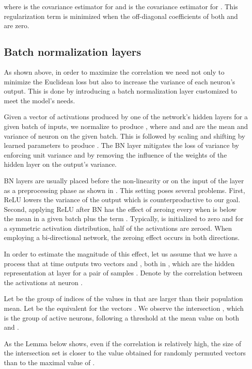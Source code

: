 \documentclass[10pt,twocolumn,letterpaper]{article}
\begin{document}
where  is the covariance estimator for  and  is the covariance estimator for . This regularization term is minimized when the off-diagonal coefficients of both  and  are zero.

\subsection{Batch normalization layers}\label{sec:bn}
As shown above, in order to maximize the correlation we need not only to minimize the Euclidean loss but also to increase the variance of each neuron's output. This is done by introducing a batch normalization layer \cite{bn} customized to meet the model's needs. 

Given a vector of activations  produced by one of the network's hidden layers for a given batch of inputs, we normalize  to produce , where  and  and  are the mean and variance of neuron  on the given batch. This is followed by scaling and shifting by learned parameters to produce . The BN layer mitigates the loss of variance by enforcing unit variance and by removing the influence of the weights of the hidden layer on the output's variance.

BN layers are usually placed before the non-linearity or on the input of the layer as a preprocessing phase as shown in \cite{he2016identity}. This setting poses several problems. First, ReLU lowers the variance of the output which is counterproductive to our goal. Second, applying ReLU after BN has the effect of zeroing every  when  is below the mean in a given batch plus the term .  Typically,  is initialized to zero and for a symmetric activation distribution, half of the activations are zeroed. When employing a bi-directional network, the zeroing effect occurs in both directions.

In order to estimate the magnitude of this effect, let us assume that we have a process that at time  outputs two vectors  and , both in , which are the hidden representation at layer  for a pair of samples . Denote by  the correlation between the activations at neuron .

Let  be the group of indices of the values in  that are larger than their population mean. Let  be the equivalent for the vectors . We observe the intersection , which is the group of active neurons, following a threshold at the mean value on both  and .

As the Lemma below shows, even if the correlation  is relatively high, the size of the intersection set  is closer to the value  obtained for randomly permuted vectors than to the maximal value of .
\end{document}
